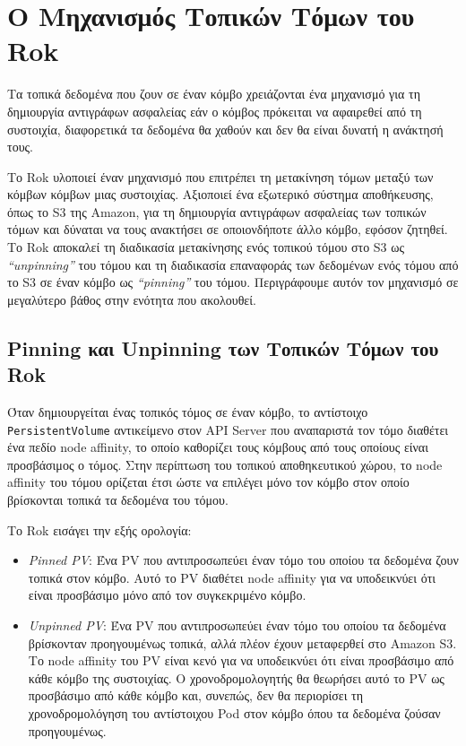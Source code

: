 \section{Ο Μηχανισμός Τοπικών Τόμων του Rok}

Τα τοπικά δεδομένα που ζουν σε έναν κόμβο χρειάζονται ένα μηχανισμό για τη
δημιουργία αντιγράφων ασφαλείας εάν ο κόμβος πρόκειται να αφαιρεθεί από τη
συστοιχία, διαφορετικά τα δεδομένα θα χαθούν και δεν θα είναι δυνατή η ανάκτησή
τους.

Το Rok υλοποιεί έναν μηχανισμό που επιτρέπει τη μετακίνηση τόμων μεταξύ των
κόμβων κόμβων μιας συστοιχίας. Αξιοποιεί ένα εξωτερικό σύστημα αποθήκευσης, όπως
το S3 της Amazon, για τη δημιουργία αντιγράφων ασφαλείας των τοπικών τόμων και
δύναται να τους ανακτήσει σε οποιονδήποτε άλλο κόμβο, εφόσον ζητηθεί. Το Rok
αποκαλεί τη διαδικασία μετακίνησης ενός τοπικού τόμου στο S3 ως
\textit{``unpinning''} του τόμου και τη διαδικασία επαναφοράς των δεδομένων ενός
τόμου από το S3 σε έναν κόμβο ως \textit{``pinning''} του τόμου. Περιγράφουμε
αυτόν τον μηχανισμό σε μεγαλύτερο βάθος στην ενότητα που ακολουθεί.

\subsection{Pinning και Unpinning των Τοπικών Τόμων του Rok}

\label{section:gr-rok-volume-pinning}

Όταν δημιουργείται ένας τοπικός τόμος σε έναν κόμβο, το αντίστοιχο
\texttt{PersistentVolume} αντικείμενο στον API Server που αναπαριστά τον τόμο
διαθέτει ένα πεδίο node affinity, το οποίο καθορίζει τους κόμβους από τους
οποίους είναι προσβάσιμος ο τόμος. Στην περίπτωση του τοπικού αποθηκευτικού
χώρου, το node affinity του τόμου ορίζεται έτσι ώστε να επιλέγει μόνο τον κόμβο
στον οποίο βρίσκονται τοπικά τα δεδομένα του τόμου.

Το Rok εισάγει την εξής ορολογία:
\begin{itemize}
      \tightlist
      \item \textit{Pinned PV}: Ένα PV που αντιπροσωπεύει έναν τόμο του οποίου
            τα δεδομένα ζουν τοπικά στον κόμβο. Αυτό το PV διαθέτει node
            affinity για να υποδεικνύει ότι είναι προσβάσιμο μόνο από τον
            συγκεκριμένο κόμβο.
      \item \textit{Unpinned PV}: Ένα PV που αντιπροσωπεύει έναν τόμο του οποίου
            τα δεδομένα βρίσκονταν προηγουμένως τοπικά, αλλά πλέον έχουν
            μεταφερθεί στο Amazon S3. Το node affinity του PV  είναι κενό για να
            υποδεικνύει ότι είναι προσβάσιμο από κάθε κόμβο της συστοιχίας. Ο
            χρονοδρομολογητής θα θεωρήσει αυτό το PV ως προσβάσιμο από κάθε
            κόμβο και, συνεπώς, δεν θα περιορίσει τη χρονοδρομολόγηση του
            αντίστοιχου Pod στον κόμβο όπου τα δεδομένα ζούσαν προηγουμένως.
\end{itemize}


